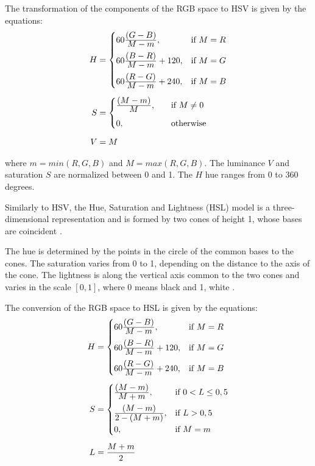 The transformation of the components of the RGB space to HSV is given by the equations:
\begin{align}
\label{eq:rgb_para_hsv}
\begin{split}
  H &=  \begin{cases}
            60\frac{\displaystyle (G - B)}{\displaystyle M - m}, & \text{if}\ M = R\\[0.7em]
            60\frac{\displaystyle (B - R)}{\displaystyle M - m} + 120, & \text{if}\ M = G\\[0.7em]
            60\frac{\displaystyle (R - G)}{\displaystyle M - m} + 240, & \text{if}\ M = B
       \end{cases}
  \\[0.5em]
  S &=  \begin{cases}
            \frac{\displaystyle (M - m)}{\displaystyle M}, \quad &\text{if}\ M \neq 0\\[0.7em]
            0, \quad &\text{otherwise}\\
       \end{cases}
  \\[0.5em]
  V &= M
\end{split}
\end{align}

\noindent where $m = min(R, G ,B)$ and $M = max(R, G ,B)$. The luminance $V$ and saturation $S$ are normalized between 0 and 1. The $H$ hue ranges from 0 to 360 degrees.

Similarly to HSV, the Hue, Saturation and Lightness (HSL) model is a three-dimensional representation and is formed by two cones of height 1, whose bases are coincident \citep{pedrini:08}.

The hue is determined by the points in the circle of the common bases to the cones. The saturation varies from 0 to 1, depending on the distance to the axis of the cone. The lightness is along the vertical axis common to the two cones and varies in the scale $[0, 1]$, where 0 means black and 1, white \citep{pedrini:08}.

The conversion of the RGB space to HSL is given by the equations:
\begin{align}
\label{eq:rgb_para_hsl}
\begin{split}
  H &=  \begin{cases}
            60\frac{\displaystyle (G - B)}{\displaystyle M - m}, & \text{if}\ M = R\\[0.7em]
            60\frac{\displaystyle (B - R)}{\displaystyle M - m} + 120, & \text{if}\ M = G\\[0.7em]
            60\frac{\displaystyle (R - G)}{\displaystyle M - m} + 240, & \text{if}\ M = B
       \end{cases}
  \\[0.5em]
  S &=  \begin{cases}
            \frac{\displaystyle (M - m)}{\displaystyle M + m}, & \text{if}\ 0 < L \leq 0,5\\[0.7em]
            \frac{\displaystyle (M - m)}{\displaystyle 2 - (M + m)}, & \text{if}\ L > 0,5\\[0.5em]
            0, & \text{if}\ M = m\\
       \end{cases}
  \\[0.5em]
  L &= \frac{M + m}{2}
\end{split}
\end{align}

